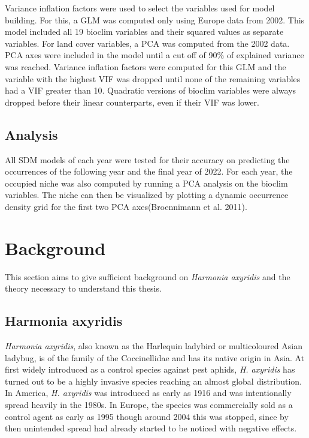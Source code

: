 \documentclass[12pt,a4paper]{article}
\begin{document}
Variance inflation factors were used to select the variables used for model building. 
For this, a GLM was computed only using Europe data from 2002.
This model included all 19 bioclim variables and their squared values as separate variables.
For land cover variables, a PCA was computed from the 2002 data.
PCA axes were included in the model until a cut off of 90\% of explained variance was reached.
Variance inflation factors were computed for this GLM and the variable with the highest VIF was dropped until none of the remaining variables had a VIF greater than 10. Quadratic versions of bioclim variables were always dropped before their linear counterparts, even if their VIF was lower.

\subsection{Analysis}
All SDM models of each year were tested for their accuracy on predicting the occurrences of the following year and the final year of 2022. 
For each year, the occupied niche was also computed by running a PCA analysis on the bioclim variables. The niche can then be visualized by plotting a dynamic occurrence density grid for the first two PCA axes(Broennimann et al. 2011).

\section{Background}
This section aims to give sufficient background on \textit{Harmonia axyridis} and the theory necessary to understand this thesis.

\subsection{Harmonia axyridis}
\textit{Harmonia axyridis}, also known as the Harlequin ladybird or multicoloured Asian ladybug, is of the family of the Coccinellidae and has its native origin in Asia.
At first widely introduced as a control species against pest aphids, \textit{H. axyridis} has turned out to be a highly invasive species reaching an almost global distribution.
In America, \textit{H. axyridis} was introduced as early as 1916 and was intentionally spread heavily in the 1980s.
In Europe, the species was commercially sold as a control agent as early as 1995 though around 2004 this was stopped, since by then unintended spread had already started to be noticed with negative effects. \cite{roy2016harlequin}

\newpage
\printbibliography[]

\end{document}
